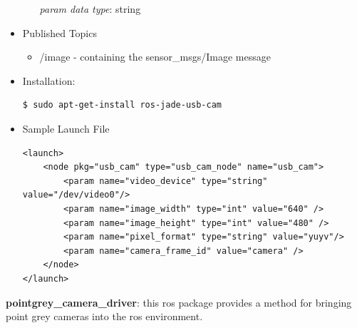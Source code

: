 \begin{itemize}
\begin{itemize}
\textit{param data type}: string
\end{itemize}
\item Published Topics
\begin{itemize}
\item /image - containing the sensor\_msgs/Image message
\end{itemize}
\item Installation:
\begin{lstlisting}[language=bash]
$ sudo apt-get-install ros-jade-usb-cam
\end{lstlisting}
\item Sample Launch File
\lstset{language=XML}
\begin{lstlisting}
<launch>
	<node pkg="usb_cam" type="usb_cam_node" name="usb_cam">
		<param name="video_device" type="string" value="/dev/video0"/>
		<param name="image_width" type="int" value="640" />
		<param name="image_height" type="int" value="480" />
		<param name="pixel_format" type="string" value="yuyv"/>
		<param name="camera_frame_id" value="camera" />
	</node>
</launch>
\end{lstlisting}
\end{itemize}



 
\noindent \textbf{pointgrey\_camera\_driver}: this ros package provides a method for bringing point grey cameras into the ros environment. 

